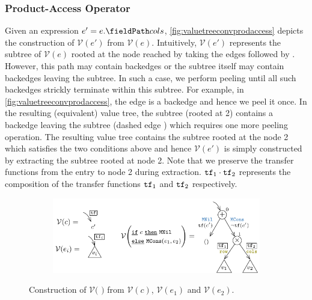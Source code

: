 \subsubsection{Product-Access Operator}
Given an expression $e' = \prodAccess{e}{cols}$,
\cref{fig:valuetreeconvprodaccess} depicts the construction of $\mathcal{V}(e')$
from $\mathcal{V}(e)$.
Intuitively, $\mathcal{V}(e')$ represents the subtree of $\mathcal{V}(e)$ rooted at the \sumn{} node reached by taking
the edges  followed by .
However, this path may contain backedges or the subtree itself may contain backedges leaving the subtree.
In such a case, we perform peeling until all such backedges strickly terminate within this subtree.
For example, in \cref{fig:valuetreeconvprodaccess}, the edge  is a backedge and hence we peel it once.
In the resulting (equivalent) value tree, the subtree (rooted at 2) contains a backedge leaving the subtree (dashed edge )
which requires one more peeling operation.
The resulting value tree contains the subtree rooted at the \sumn{} node 2 which satisfies the two conditions above and
hence $\mathcal{V}(e')$ is simply constructed by extracting the subtree rooted at node 2.
Note that we preserve the transfer functions from the entry to node 2 during extraction.
${\tt tf}{}_1 \cdot {\tt tf}{}_2$ represents the composition of the transfer functions ${\tt tf}{}_1$ and ${\tt tf}{}_2$ respectively.

\begin{figure}[t!]
\begin{subfigure}[b]{\textwidth}
\begin{center}
\includegraphics[scale=1.3]{chapters/figures/figValueTreeConvIte.pdf}
\end{center}
\end{subfigure}
\vspace{5px}
\caption{\label{fig:valuetreeconvite}Construction of $\mathcal{V}($    $)$ from $\mathcal{V}(c)$, $\mathcal{V}(e_1)$ and $\mathcal{V}(e_2)$.}
\end{figure}

